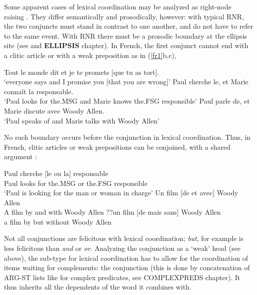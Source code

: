 \documentclass[output=paper]{langsci/langscibook}
\begin{document}
Some apparent cases of lexical coordination may be analyzed as right-node raising \citep{Beavers}. They differ semantically and prosodically, however: with typical RNR, the two conjuncts must stand in contrast to one another, and do not have to refer to the same event. With RNR there must be a prosodic boundary at the ellipsis site (see \citet{chavesrnr} and {\bf ELLIPSIS} chapter). In French, the first conjunct cannot end with a clitic article or with a weak preposition as in (\ref{fr1}b,c),

\begin{exe}
 \ex
\begin{xlista}
\ex  Tout le monde dit et je te promets $[$que tu as tort$]$.\\
`everyone says and I promise you $[$that you are wrong$]$'
\ex  *Paul cherche le, et Marie connaît la responsable.\\
 `Paul looks for the.MSG and Marie knows the.FSG  responsible'
\ex  *Paul parle de, et Marie discute avec Woody Allen.\\
`Paul speaks of and Marie talks with Woody Allen'
\end{xlista}\label{fr1}
\end{exe}



No such boundary occurs before the conjunction in lexical coordination. Thus, in French,  clitic articles or weak prepositions can be conjoined, with a shared argument \citep{Abeille:06}:


\begin{exe}
 \ex
\begin{xlista}
\ex \gll Paul cherche $[$le ou la$]$ responsable\\
Paul looks for the.MSG or the.FSG responsible\\
\glt `Paul is looking for the man or woman in charge'
\ex  Un film $[$de et avec$]$ Woody Allen\\
A film by and with Woody Allen
\ex  ??un film $[$de mais sans$]$ Woody Allen\\
a film by but without Woody Allen
\end{xlista}
\end{exe}

\noindent
Not all conjunctions are felicitous with lexical coordination; \textit{but}, for example is less felicitous than \textit{and} or \textit{or}.
Analyzing the conjunction as a ‘weak’ head (see above), the sub-type for lexical coordination has to allow for the coordination of items waiting for complements: the conjunction (this is done by concatenation of ARG-ST lists like for complex predicates, see COMPLEXPREDS chapter). It thus inherits all the dependents of the word it combines with.
\end{document}
